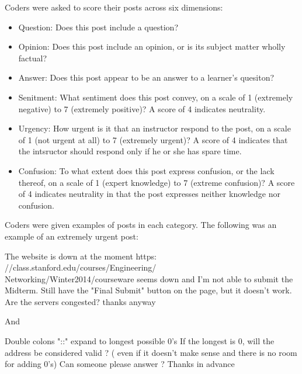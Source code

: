 \documentclass{edm_template}
\begin{document}
Coders were asked to score their posts across six dimensions:
\begin{itemize}
\vspace{-15pt}
       \setlength\itemsep{0.05em}
       \item Question: Does this post include a question?
       \item Opinion: Does this post include an opinion, or is its subject matter wholly factual?
       \item Answer: Does this post appear to be an answer to a learner's quesiton?
       \item Senitment: What sentiment does this post convey, on a scale of 1 (extremely negative) to 7 (extremely positive)? A score of 4 indicates neutrality.
       \item Urgency: How urgent is it that an instructor respond to the post, on a scale of 1 (not urgent at all) to 7 (extremely urgent)? A score of 4 indicates that the intsructor should respond only if he or she has spare time.
       \item Confusion: To what extent does this post express confusion, or the lack thereof, on a scale of 1 (expert knowledge) to 7 (extreme confusion)? A score of 4 indicates neutrality in that the post expresses neither knowledge nor confusion.
\end{itemize}
\vspace{-15pt}
Coders were given examples of posts in each category. The following was an example of an extremely urgent post:

\vspace{-14pt}
\begin{displayquote}
The website is down at the moment
       https:\\//class.stanford.edu/courses/Engineering/\\Networking/Winter2014/courseware
       seems down and I'm not able to submit the Midterm. Still have
       the "Final Submit" button on the page, but it doesn't work. Are
       the servers congested? 
       thanks anyway
\end{displayquote}
\vspace{-14pt}

And

\vspace{-14pt}
\begin{displayquote}
Double colons "::"  expand to longest possible 0's  
       If the longest is 0, will  the address be considered valid ?  (
       even if it doesn't make sense and there is no room for adding
       0's) 
       Can someone please answer ?
       Thanks in advance
\end{displayquote}
\vspace{-14pt}
\end{document}
